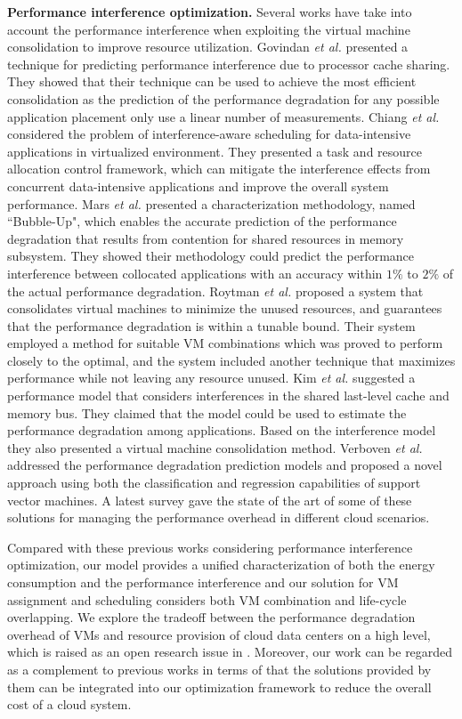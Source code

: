 \documentclass[10pt,journal]{IEEEtran}
\begin{document}
\textbf{Performance interference optimization.} 
Several works  \cite{Govindan11, Chiang11, Mars11, Roytman13, Kim13, Verboven13, Xu14} have take into account the performance interference when exploiting the virtual machine consolidation to improve resource utilization. Govindan \emph{et al.} \cite{Govindan11} presented a technique for predicting performance interference due to processor cache sharing. They showed that their technique can be used to achieve the most efficient consolidation as the prediction of the performance degradation for any possible application placement only use a linear number of measurements. Chiang \emph{et al.} \cite{Chiang11} considered the problem of interference-aware scheduling for data-intensive applications in virtualized environment. They presented a task and resource allocation control framework, which can mitigate the interference effects from concurrent data-intensive applications and improve the overall system performance. Mars \emph{et al.} \cite{Mars11} presented a characterization methodology, named ``Bubble-Up", which enables the accurate prediction of the performance degradation that results from contention for shared resources in memory subsystem. They showed their methodology could predict the performance interference between collocated applications with an accuracy within $1\%$ to $2\%$ of the actual performance degradation. Roytman \emph{et al.} \cite{Roytman13} proposed a system that consolidates virtual machines to minimize the unused resources, and guarantees that the performance degradation is within a tunable bound. Their system employed a method for suitable VM combinations which was proved to perform closely to the optimal, and the system included another technique that maximizes performance while not leaving any resource unused. Kim \emph{et al.} \cite{Kim13} suggested a performance model that considers interferences in the shared last-level cache and memory bus. They claimed that the model could be used to estimate the performance degradation among applications. Based on the interference model they also presented a virtual machine consolidation method. Verboven \emph{et al.} \cite{Verboven13} addressed the performance degradation prediction models and proposed a novel approach using both the classification and regression capabilities of support vector machines. A latest survey \cite{Xu14} gave the state of the art of some of these solutions for managing the performance overhead in different cloud scenarios.

Compared with these previous works considering performance interference optimization, our model provides a unified characterization of both the energy consumption and the performance interference and our solution for VM assignment and scheduling considers both VM combination and life-cycle overlapping. We explore the tradeoff between the performance degradation overhead of VMs and resource provision of cloud data centers on a high level, which is raised as an open research issue in \cite{Esch14}. Moreover, our work can be regarded as a complement to previous works in terms of that the solutions provided by them can be integrated into our optimization framework to reduce the overall cost of a cloud system.
\end{document}
